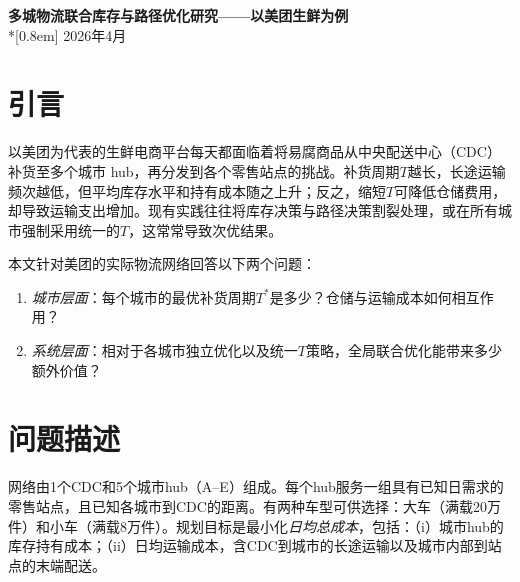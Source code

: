 \documentclass[10pt]{ctexart}
\begin{document}
\begin{center}
    {\Large\bfseries 多城物流联合库存与路径优化研究——以美团生鲜为例}\\*[0.8em]
    {\small 2026年4月}
\end{center}

\begin{abstract}
\noindent\textbf{摘要——}
生鲜电商的“最后一公里”配送网络面临着库存持有成本与运输成本之间的根本性权衡。本文针对一个由1个中央配送中心（CDC）和5个卫星城（共25个零售站点）组成的物流网络，提出了库存与路径联合优化框架。对每个城市，我们通过平衡仓储与运输成本来优化补货周期$T$；进而枚举全部$7^5=16{,}807$种全局$T$组合，以确定系统层面的最优解。最优配置实现了\textbf{24,874元/天}的总成本，各城市的最优补货周期从$T^*=1$到$T^*=6$不等。与统一$T$基线策略相比，差异化的最优策略最多可节省\textbf{20,058元/天}（80.6\%）。结果表明，在城市特征异质化的物流网络中，城市专属的补货政策对于成本高效运营至关重要。
\end{abstract}

\section{引言}
以美团为代表的生鲜电商平台每天都面临着将易腐商品从中央配送中心（CDC）补货至多个城市 hub，再分发到各个零售站点的挑战。补货周期$T$越长，长途运输频次越低，但平均库存水平和持有成本随之上升；反之，缩短$T$可降低仓储费用，却导致运输支出增加。现有实践往往将库存决策与路径决策割裂处理，或在所有城市强制采用统一的$T$，这常常导致次优结果。

本文针对美团的实际物流网络回答以下两个问题：
\begin{enumerate}
    \item \textit{城市层面}：每个城市的最优补货周期$T^*$是多少？仓储与运输成本如何相互作用？
    \item \textit{系统层面}：相对于各城市独立优化以及统一$T$策略，全局联合优化能带来多少额外价值？
\end{enumerate}

\section{问题描述}
网络由1个CDC和5个城市hub（A--E）组成。每个hub服务一组具有已知日需求的零售站点，且已知各城市到CDC的距离。有两种车型可供选择：大车（满载20万件）和小车（满载8万件）。规划目标是最小化\emph{日均总成本}，包括：（i）城市hub的库存持有成本；（ii）日均运输成本，含CDC到城市的长途运输以及城市内部到站点的末端配送。
\end{document}
